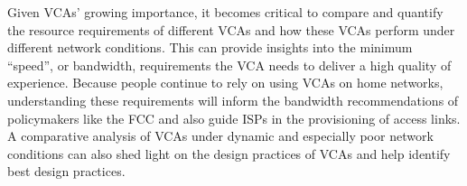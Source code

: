 
Given VCAs' growing importance, it becomes critical to compare and quantify the resource requirements of different VCAs and how these VCAs perform under different network conditions. This can provide insights into the minimum  ``speed'', or bandwidth, requirements the VCA needs to deliver a high quality of experience. Because people continue to rely on using VCAs on home networks, understanding these requirements will inform the bandwidth recommendations of policymakers like the FCC and also guide ISPs in the provisioning of access links. A comparative analysis of VCAs under dynamic and especially poor network conditions can also shed light on the design practices of VCAs and help identify best design practices.

